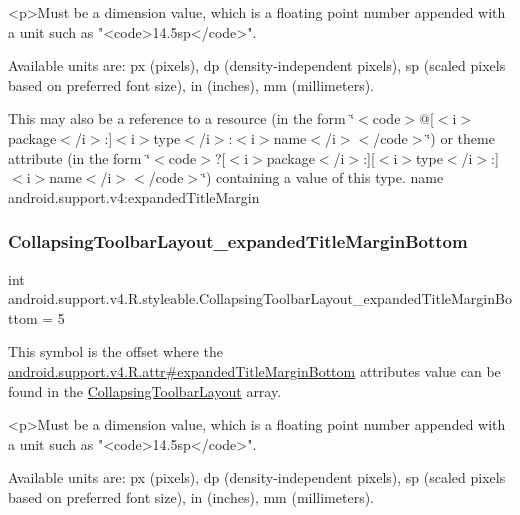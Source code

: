 \begin{DoxyVerb}      <p>Must be a dimension value, which is a floating point number appended with a unit such as "<code>14.5sp</code>".
\end{DoxyVerb}
 Available units are\+: px (pixels), dp (density-\/independent pixels), sp (scaled pixels based on preferred font size), in (inches), mm (millimeters). 

This may also be a reference to a resource (in the form \char`\"{}$<$code$>$@\mbox{[}$<$i$>$package$<$/i$>$\+:\mbox{]}$<$i$>$type$<$/i$>$\+:$<$i$>$name$<$/i$>$$<$/code$>$\char`\"{}) or theme attribute (in the form \char`\"{}$<$code$>$?\mbox{[}$<$i$>$package$<$/i$>$\+:\mbox{]}\mbox{[}$<$i$>$type$<$/i$>$\+:\mbox{]}$<$i$>$name$<$/i$>$$<$/code$>$\char`\"{}) containing a value of this type.  name android.\+support.\+v4\+:expanded\+Title\+Margin \mbox{\label{classandroid_1_1support_1_1v4_1_1R_1_1styleable_af294e92101d0832bed66945ee1c5f89b}} 
\subsubsection{\texorpdfstring{Collapsing\+Toolbar\+Layout\+\_\+expanded\+Title\+Margin\+Bottom}{CollapsingToolbarLayout\_expandedTitleMarginBottom}}
{\footnotesize\ttfamily int android.\+support.\+v4.\+R.\+styleable.\+Collapsing\+Toolbar\+Layout\+\_\+expanded\+Title\+Margin\+Bottom = 5\hspace{0.3cm}{\ttfamily [static]}}

This symbol is the offset where the \hyperlink{classandroid_1_1support_1_1v4_1_1R_1_1attr_a605a1cf1c2977b6aefafeafd2cb9c602}{android.\+support.\+v4.\+R.\+attr\#expanded\+Title\+Margin\+Bottom} attribute\textquotesingle{}s value can be found in the \hyperlink{classandroid_1_1support_1_1v4_1_1R_1_1styleable_a91b20e27088c910353d38c1efde32aa9}{Collapsing\+Toolbar\+Layout} array.

\begin{DoxyVerb}      <p>Must be a dimension value, which is a floating point number appended with a unit such as "<code>14.5sp</code>".
\end{DoxyVerb}
 Available units are\+: px (pixels), dp (density-\/independent pixels), sp (scaled pixels based on preferred font size), in (inches), mm (millimeters). 

